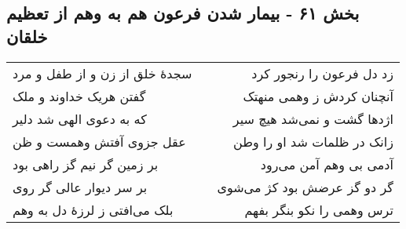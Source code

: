\begin{center}
\section*{بخش ۶۱ - بیمار شدن فرعون هم به وهم از تعظیم خلقان}
\label{sec:sh061}
\begin{longtable}{l p{0.5cm} r}
سجدهٔ خلق از زن و از طفل و مرد
&&
زد دل فرعون را رنجور کرد
\\
گفتن هریک خداوند و ملک
&&
آنچنان کردش ز وهمی منهتک
\\
که به دعوی الهی شد دلیر
&&
اژدها گشت و نمی‌شد هیچ سیر
\\
عقل جزوی آفتش وهمست و ظن
&&
زانک در ظلمات شد او را وطن
\\
بر زمین گر نیم گز راهی بود
&&
آدمی بی وهم آمن می‌رود
\\
بر سر دیوار عالی گر روی
&&
گر دو گز عرضش بود کژ می‌شوی
\\
بلک می‌افتی ز لرزهٔ دل به وهم
&&
ترس وهمی را نکو بنگر بفهم
\\
\end{longtable}
\end{center}
